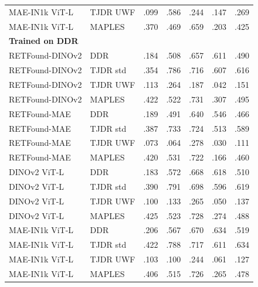 {\begin{longtable}{l l c c c c c}
MAE-IN1k ViT-L & TJDR UWF & .099 & .586 & .244 & .147 & .269 \\
MAE-IN1k ViT-L & MAPLES & .370 & .469 & .659 & .203 & .425 \\
\multicolumn{7}{l}{\textbf{Trained on DDR}}\\
RETFound-DINOv2 & DDR & .184 & .508 & .657 & .611 & .490 \\
RETFound-DINOv2 & TJDR std & .354 & .786 & .716 & .607 & .616 \\
RETFound-DINOv2 & TJDR UWF & .113 & .264 & .187 & .042 & .151 \\
RETFound-DINOv2 & MAPLES & .422 & .522 & .731 & .307 & .495 \\
RETFound-MAE & DDR & .189 & .491 & .640 & .546 & .466 \\
RETFound-MAE & TJDR std & .387 & .733 & .724 & .513 & .589 \\
RETFound-MAE & TJDR UWF & .073 & .064 & .278 & .030 & .111 \\
RETFound-MAE & MAPLES & .420 & .531 & .722 & .166 & .460 \\
DINOv2 ViT-L & DDR & .183 & .572 & .668 & .618 & .510 \\
DINOv2 ViT-L & TJDR std & .390 & .791 & .698 & .596 & .619 \\
DINOv2 ViT-L & TJDR UWF & .100 & .133 & .265 & .050 & .137 \\
DINOv2 ViT-L & MAPLES & .425 & .523 & .728 & .274 & .488 \\
MAE-IN1k ViT-L & DDR & .206 & .567 & .670 & .634 & .519 \\
MAE-IN1k ViT-L & TJDR std & .422 & .788 & .717 & .611 & .634 \\
MAE-IN1k ViT-L & TJDR UWF & .103 & .100 & .244 & .061 & .127 \\
MAE-IN1k ViT-L & MAPLES & .406 & .515 & .726 & .265 & .478 \\
\end{longtable}
}
